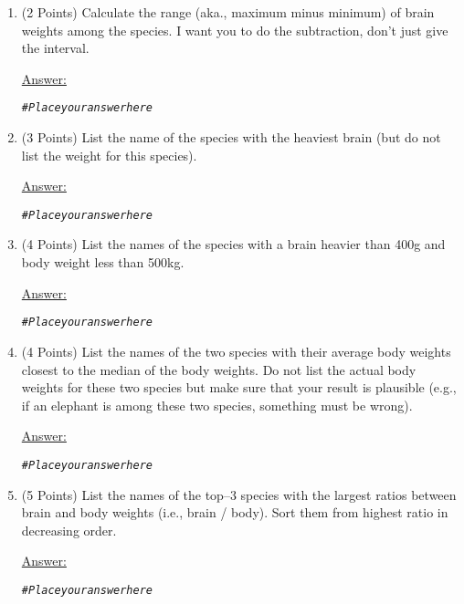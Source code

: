 \documentclass[12pt,letterpaper,final]{article}\usepackage[]{graphicx}\usepackage[]{xcolor}
\makeatletter
\newcommand{\hlcom}[1]{\textcolor[rgb]{0.678,0.584,0.686}{\textit{#1}}}%
\newenvironment{kframe}{%
 \def\at@end@of@kframe{}%
 \ifinner\ifhmode%
  \def\at@end@of@kframe{\end{minipage}}%
  \begin{minipage}{\columnwidth}%
 \fi\fi%
 \def\FrameCommand##1{\hskip\@totalleftmargin \hskip-\fboxsep
 \colorbox{shadecolor}{##1}\hskip-\fboxsep
     \hskip-\linewidth \hskip-\@totalleftmargin \hskip\columnwidth}%
 \MakeFramed {\advance\hsize-\width
   \@totalleftmargin\z@ \linewidth\hsize
   \@setminipage}}%
 {\par\unskip\endMakeFramed%
 \at@end@of@kframe}
\makeatother
\begin{document}
\begin{enumerate}
\begin{enumerate}
{\bf Work with mnames, mbody, and mbrain from now on!}


\item (2 Points) 
Calculate the range (aka., maximum minus minimum) of brain weights among
the species. I want you to do the subtraction, don't just give the interval.

\underline{Answer:}
\begin{kframe}
\begin{alltt}
\hlcom{# Place your answer here}
\end{alltt}
\end{kframe}


\item (3 Points)
List the name of the species with the heaviest brain (but do not list the
weight for this species).

\underline{Answer:}
\begin{kframe}
\begin{alltt}
\hlcom{# Place your answer here}
\end{alltt}
\end{kframe}


\item (4 Points)
List the names of the species with a brain heavier than 400g and body
weight less than 500kg.

\underline{Answer:}
\begin{kframe}
\begin{alltt}
\hlcom{# Place your answer here}
\end{alltt}
\end{kframe}


\item (4 Points)
List the names of the two species with their average body weights closest
to the median of the body weights. Do not list the actual body weights 
for these two species but make sure that your result is plausible
(e.g., if an elephant is among these two species, something must be wrong).

\underline{Answer:}
\begin{kframe}
\begin{alltt}
\hlcom{# Place your answer here}
\end{alltt}
\end{kframe}


\item (5 Points)
List the names of the top--3 species with the largest ratios between
brain and body weights (i.e., brain / body). Sort them from 
highest ratio in decreasing order.
 
\underline{Answer:}
\begin{kframe}
\begin{alltt}
\hlcom{# Place your answer here}
\end{alltt}
\end{kframe}

\end{enumerate}

\end{enumerate}
\end{document}
